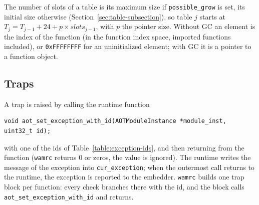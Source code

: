 \documentclass{article}
\begin{document}
The number of slots of a table is its maximum size if \verb|possible_grow| is set, its initial size otherwise (Section~\ref{sec:table-subsection}), so table $j$ starts at $T_j = T_{j-1} + 24 + p \times \mathit{slots}_{j-1}$, with $p$ the pointer size.
Without GC an element is the index of the function (in the function index space, imported functions included), or \verb|0xFFFFFFFF| for an uninitialized element; with GC it is a pointer to a function object.

\subsection{Traps}
\label{sec:abi-traps}
A trap is raised by calling the runtime function
\begin{verbatim}
void aot_set_exception_with_id(AOTModuleInstance *module_inst, uint32_t id);
\end{verbatim}
with one of the ids of Table~\ref{table:exception-ids}, and then returning from the function (\texttt{wamrc} returns 0 or zeros, the value is ignored).
The runtime writes the message of the exception into \verb|cur_exception|; when the outermost call returns to the runtime, the exception is reported to the embedder.
\texttt{wamrc} builds one trap block per function: every check branches there with the id, and the block calls \verb|aot_set_exception_with_id| and returns.
\end{document}
